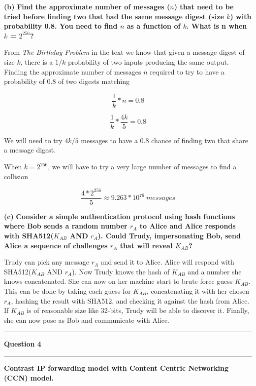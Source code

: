 \documentclass[11pt]{article}
\newcommand\question[2]{\vspace{.25in}\hrule\textbf{#1}\vspace{.5em}\hrule\vspace{.10in}}
\renewcommand\part[1]{\vspace{.10in}\textbf{(#1)}}
\begin{document}
\part{b} \textbf{ Find the approximate number of messages ($n$) that need to be tried
before finding two that had the same message digest (size $k$) with probability 0.8.
You need to find $n$ as a function of $k$. What is n when $k$ = $2^{256}$?} \newline

From \textit{The Birthday Problem} in the text we know that given a message digest of size $k$, there is a $1/k$ probability of two inputs producing the same output. Finding the approximate number of messages $n$ required to try to have a probability of 0.8 of two digests matching

$$\frac{1}{k} * n = 0.8$$

$$\frac{1}{k} * \frac{4k}{5} = 0.8$$

We will need to try $4k/5$ messages to have a 0.8 chance of finding two that share a message digest.

When $k = 2^{256}$, we will have to try a very large number of messages to find a collision

$$\frac{4 * 2^{256}}{5} \approx 9.263 * 10^{76} \ messages$$

\part{c} \textbf{ Consider a simple authentication protocol using hash functions where
Bob sends a random number $r_A$ to Alice and Alice responds with SHA512($K_{AB}$
AND $r_A$). Could Trudy, impersonating Bob, send Alice a sequence of challenges
$r_A$ that will reveal $K_{AB}$?} \newline

Trudy can pick any message $r_A$ and send it to Alice. Alice will respond with SHA512($K_{AB}$ AND $r_A$). Now Trudy knows the hash of $K_{AB}$ and a number she knows concatenated. She can now on her machine start to brute force guess $K_{AB}$. This can be done by taking each guess for $K_{AB}$, concatenating it with her chosen $r_A$, hashing the result with SHA512, and checking it against the hash from Alice. If $K_{AB}$ is of reasonable size like 32-bits, Trudy will be able to discover it. Finally, she can now pose as Bob and communicate with Alice.

\question{Question 4}

\part{1} \textbf{Contrast IP forwarding model with Content Centric Networking (CCN) model.} \newline
\end{document}
